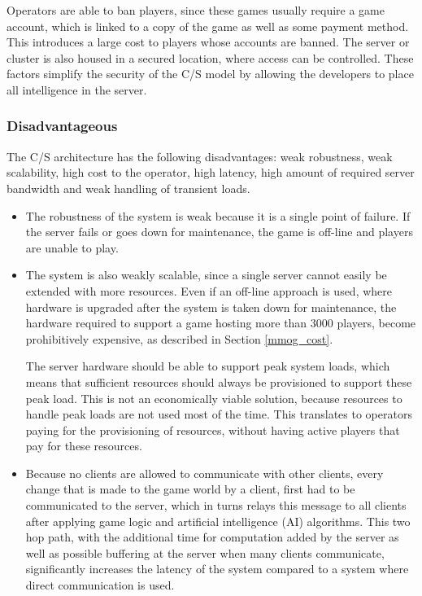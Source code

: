 Operators are able to ban players, since these games usually require a game account, which is linked to a copy of the game as well as some payment method. This introduces a large cost to players whose accounts are banned. The server or cluster is also housed in a secured location, where access can be controlled. These factors simplify the security of the C/S model by allowing the developers to place all intelligence in the server.

\subsubsection{Disadvantageous}
\label{classic_cs_disadvantages}

The C/S architecture has the following disadvantages: weak robustness, weak scalability, high cost to the operator, high latency, high amount of required server bandwidth and weak handling of transient loads.
\begin{itemize}
\item The robustness of the system is weak because it is a single point of failure. If the server fails or goes down for maintenance, the game is off-line and players are unable to play.

\item The system is also weakly scalable, since a single server cannot easily be extended with more resources. Even if an off-line approach is used, where hardware is upgraded after the system is taken down for maintenance, the hardware required to support a game hosting more than 3000 players, become prohibitively expensive, as described in Section \ref{mmog_cost}.

The server hardware should be able to support peak system loads, which means that sufficient resources should always be provisioned to support these peak load. This is not an economically viable solution, because resources to handle peak loads are not used most of the time. This translates to operators paying for the provisioning of resources, without having active players that pay for these resources.

\item Because no clients are allowed to communicate with other clients, every change that is made to the game world by a client, first had to be communicated to the server, which in turns relays this message to all clients after applying game logic and artificial intelligence (AI) algorithms. This two hop path, with the additional time for computation added by the server as well as possible buffering at the server when many clients communicate, significantly increases the latency of the system compared to a system where direct communication is used.
\end{itemize}

